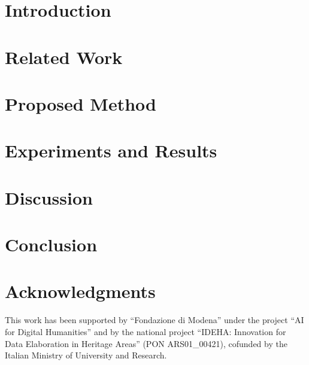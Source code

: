 \documentclass[times,authoryear]{elsarticle}
\begin{document}

\section{Introduction}
\label{sec:introduction}


\section{Related Work}
\label{sec:related}


\section{Proposed Method}
\label{sec:method}


\section{Experiments and Results}
\label{sec:results}


\section{Discussion}
\label{sec:discussion}


\section{Conclusion}
\label{sec:conclusion}


\section*{Acknowledgments}
This work has been supported by ``Fondazione di Modena'' under the project ``AI for Digital Humanities'' and by the national project ``IDEHA: Innovation for Data Elaboration in Heritage Areas'' (PON ARS01\_00421), cofunded by the Italian Ministry of University and Research.





\end{document}
